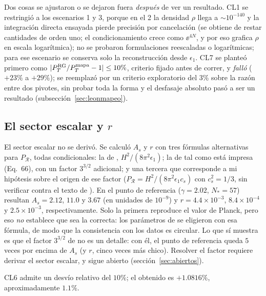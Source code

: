 Dos cosas se ajustaron o se dejaron fuera \emph{después} de ver un resultado. CL1 se restringió a los escenarios 1 y 3, porque en el 2 la densidad $\rho$ llega a $\sim10^{-140}$ y la integración directa ensayada pierde precisión por cancelación (se obtiene de restar cantidades de orden uno; el condicionamiento crece como $\ee^{4N}$, y por eso \cite{leon22} grafica $\rho$ en escala logarítmica); no se probaron formulaciones reescaladas o logarítmicas; para ese escenario se conserva solo la reconstrucción desde $\epsilon_1$. CL7 se planteó primero como $|P_T^{\rm RG}/P_T^{\rm mapa}-1|\le10\%$, criterio fijado antes de correr, y \emph{falló} ($+23\%$ a $+29\%$); se reemplazó por un criterio exploratorio del 3\% sobre la razón entre dos pivotes, sin probar toda la forma y el desfasaje absoluto pasó a ser un resultado (subsección~\ref{sec:leonmapeo}).

\subsection{El sector escalar y $r$}
\label{sec:leonescalar}

El sector escalar no se derivó. Se calculó $A_s$ y $r$ con tres fórmulas alternativas para $P_\mathcal{R}$, todas condicionales: la de \cite{piccirilli23}, $H^2/(8\pi^2\epsilon_1)$; la de \cite{leon22} tal como está impresa (Eq.~66), con un factor $3^{3/2}$ adicional; y una tercera que corresponde a mi hipótesis sobre el origen de ese factor ($P_\mathcal{R}=H^2/(8\pi^2\epsilon_1c_s)$ con $c_s^2=1/3$, sin verificar contra el texto de \cite{garriga99}). En el punto de referencia ($\gamma=2.02$, $N_*=57$) resultan $A_s=2.12$, $11.0$ y $3.67$ (en unidades de $10^{-9}$) y $r=4.4\times10^{-3}$, $8.4\times10^{-4}$ y $2.5\times10^{-3}$, respectivamente. Solo la primera reproduce el valor de Planck, pero eso \emph{no} establece que sea la correcta: los parámetros de \cite{piccirilli23} se eligieron con esa fórmula, de modo que la consistencia con los datos es circular. Lo que sí muestra es que el factor $3^{3/2}$ de \cite{leon22} no es un detalle: con él, el punto de referencia queda $5$ veces por encima de $A_s$ (y $r$, cinco veces más chico). Resolver el factor requiere derivar el sector escalar, y sigue abierto (sección~\ref{sec:abiertos}).

CL6 admite un desvío relativo del $10\%$; el obtenido es $+1.0816\%$, aproximadamente $1.1\%$.
